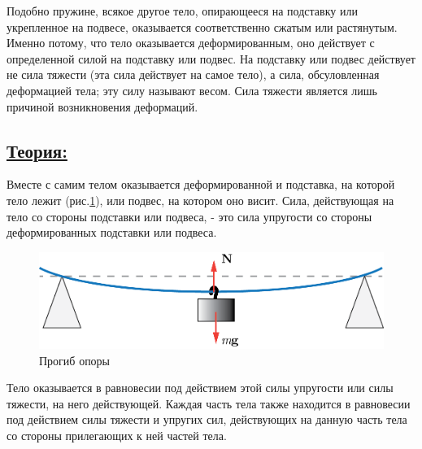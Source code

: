 \documentclass[14pt,a4paper,oneside]{extarticle}	%
\begin{document}
Подобно пружине, всякое другое тело, опирающееся на подставку или укрепленное на подвесе, оказывается соответственно сжатым или растянутым.
Именно потому, что тело оказывается деформированным, оно действует с определенной силой на подставку или подвес.
На подставку или подвес действует не сила тяжести (эта сила действует на самое тело), а сила, обсуловленная деформацией тела; эту силу называют весом.
Сила тяжести является лишь причиной возникновения деформаций.

\subsection*{\underline{Теория:}}

Вместе с самим телом оказывается деформированной и подставка, на которой тело лежит (рис.\ref{bend-2}), или подвес, на котором оно висит.
Сила, действующая на тело со стороны подставки или подвеса, - это сила упругости со стороны деформированных подставки или подвеса.
\begin{figure}[H] 
	\centering 	
	\includegraphics[width=0.75\linewidth]{bend-2.png}
	\caption{Прогиб опоры}
	\label{bend-2}
\end{figure}

Тело оказывается в равновесии под действием этой силы упругости или силы тяжести, на него действующей.
Каждая часть тела также находится в равновесии под действием силы тяжести и упругих сил, действующих на данную часть тела со стороны прилегающих к ней частей тела.
\end{document}
